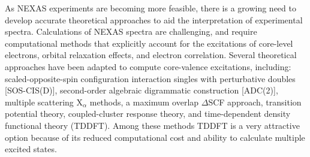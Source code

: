 \documentclass[12pt]{article}
\begin{document}
As NEXAS experiments are becoming more feasible, there is a growing need to develop accurate theoretical approaches to aid the interpretation of experimental spectra.
Calculations of NEXAS spectra are challenging, and require computational methods that explicitly account for the excitations of core-level electrons, orbital relaxation effects, and electron correlation. \cite{coriani_coupled-cluster_2012} Several theoretical approaches have been adapted to compute core-valence excitations, including: scaled-opposite-spin configuration interaction singles with perturbative doubles [SOS-CIS(D)],\cite{asmuruf_calculation_2008} second-order algebraic digrammatic construction [ADC(2)],\cite{schirmer_beyond_1982,trofimov_efficient_1995} multiple scattering X$_\alpha$ methods, \cite{sheehy_correlation_1989} a maximum overlap $\Delta$SCF approach, \cite{besley_self-consistent-field_2009} transition potential theory,\cite{triguero_calculations_1998} coupled-cluster response theory, \cite{coriani_coupled-cluster_2012} and time-dependent density functional theory (TDDFT).\cite{stener_time_2003} Among these methods TDDFT is a very attractive option because of its reduced computational cost and ability to calculate multiple excited states.
\end{document}
